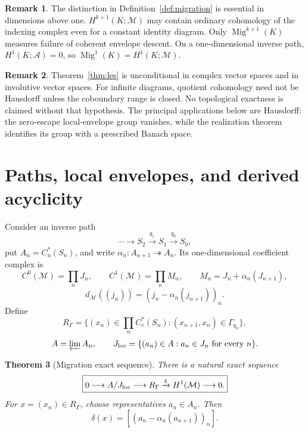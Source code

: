 \documentclass[11pt,a4paper]{amsart}
\theoremstyle{plain}
\newtheorem{theorem}{Theorem}[section]
\theoremstyle{definition}
\newtheorem{remark}[theorem]{Remark}
\newcommand{\Cu}{C_u^*}
\newcommand{\Ce}{C_e^*}
\begin{document}
\begin{remark}
The distinction in Definition~\ref{def:migration} is essential in dimensions above one.
\(H^{k+1}(K;\mathcal M)\) may contain ordinary cohomology of the indexing complex even for a
constant identity diagram.  Only \(\operatorname{Mig}^{k+1}(K)\) measures failure of coherent
envelope descent.  On a one-dimensional inverse path,
\(H^1(K;\mathcal A)=0\), so \(\operatorname{Mig}^1(K)=H^1(K;\mathcal M)\).
\end{remark}

\begin{remark}\label{rem:topology}
Theorem~\ref{thm:les} is unconditional in complex vector spaces and in involutive vector spaces.
For infinite diagrams, quotient cohomology need not be Hausdorff unless the coboundary range is
closed.  No topological exactness is claimed without that hypothesis.  The principal
applications below are Hausdorff: the zero-escape local-envelope group vanishes, while the
realization theorem identifies its group with a prescribed Banach space.
\end{remark}

\section{Paths, local envelopes, and derived acyclicity}\label{sec:path}

Consider an inverse path
\[
 \cdots\longrightarrow S_2\xrightarrow{q_1}S_1\xrightarrow{q_0}S_0,
\]
put $A_n=\Cu(S_n)$, and write
\(\alpha_n:A_{n+1}\twoheadrightarrow A_n\).  Its one-dimensional coefficient complex is
\[
 C^0(\mathcal M)=\prod_nJ_n,\qquad
 C^1(\mathcal M)=\prod_nM_n,\qquad
 M_n=J_n+\alpha_n(J_{n+1}),
\]
\[
 d_{\mathcal M}((j_n))=(j_n-\alpha_n(j_{n+1}))_n.
\]
Define
\[
 R_\Gamma=
 \{(x_n)\in\prod_n\Ce(S_n):(x_{n+1},x_n)\in\Gamma_{q_n}\},
\]
\[
 A=\varprojlim A_n,\qquad
 J_{\rm loc}=\{(a_n)\in A:a_n\in J_n\text{ for every }n\}.
\]

\begin{theorem}[Migration exact sequence]\label{thm:migration}
There is a natural exact sequence
\[
 \boxed{
 0\longrightarrow A/J_{\rm loc}\longrightarrow R_\Gamma
 \xrightarrow{\delta}H^1(\mathcal M)\longrightarrow0.}
\]
For $x=(x_n)\in R_\Gamma$, choose representatives $a_n\in A_n$.  Then
\[
 \delta(x)=
 [(a_n-\alpha_n(a_{n+1}))_n].
\]
\end{theorem}
\end{document}
